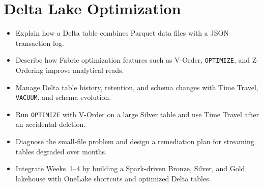 \chapter{Delta Lake Optimization}

\begin{objectives}
\begin{itemize}
    \item Explain how a Delta table combines Parquet data files with a JSON transaction log.
    \item Describe how Fabric optimization features such as V-Order, \texttt{OPTIMIZE}, and Z-Ordering improve analytical reads.
    \item Manage Delta table history, retention, and schema changes with Time Travel, \texttt{VACUUM}, and schema evolution.
    \item Run \texttt{OPTIMIZE} with V-Order on a large Silver table and use Time Travel after an accidental deletion.
    \item Diagnose the small-file problem and design a remediation plan for streaming tables degraded over months.
    \item Integrate Weeks~1--4 by building a Spark-driven Bronze, Silver, and Gold lakehouse with OneLake shortcuts and optimized Delta tables.
\end{itemize}
\end{objectives}

